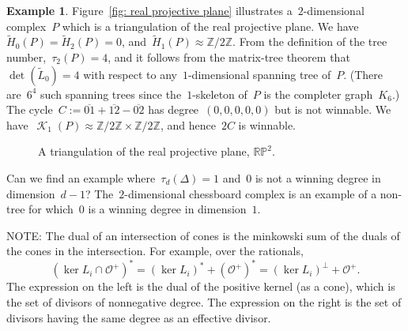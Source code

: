 \documentclass[12pt]{article}
\newcommand{\Z}{\mathbb{Z}}
\newcommand{\R}{\mathbb{R}}
\newcommand{\tL}{\widetilde{L}}
\newcommand{\tH}{\widetilde{H}}
\newcommand{\proj}{\mathbb{P}}
\DeclareMathOperator{\crit}{\mathcal{K}}
\theoremstyle{definition}
\newtheorem{example}[theorem]{Example}
\theoremstyle{remark}
\begin{document}
\begin{example}
  Figure~\ref{fig: real projective plane} illustrates a~$2$-dimensional
  complex~$P$ which is a triangulation of the real projective plane.  We
  have~$\tH_0(P)=\tH_2(P)=0$, and~$\tH_1(P)\approx\Z/2\Z$.  From the definition
  of the tree number,~$\tau_2(P)=4$, and it follows from the matrix-tree theorem
  that~$\det(\tL_0)=4$ with respect to any~$1$-dimensional spanning tree
  of~$P$.  (There are~$6^4$ such spanning trees since the~$1$-skeleton
  of~$P$ is the completer graph~$K_6$.)  The
  cycle~$C:=\overline{01}+\overline{12}-\overline{02}$ has degree~$(0,0,0,0,0)$ but
  is not winnable.  We have~$\crit_1(P)\approx\Z/2\Z\times\Z/2\Z$, and
  hence~$2C$ is winnable.
\begin{figure}[ht] 
  \centering
{}
\caption{A triangulation of the real projective plane, $\R\proj^2$.}\label{fig:
real projective plane} 
\end{figure}
\end{example}

  Can we find an example where~$\tau_d(\Delta)=1$
and~$0$ is not a winning degree in dimension~$d-1$?  The~$2$-dimensional
chessboard complex is an example of a non-tree for which~$0$ is a winning degree
in dimension~$1$.
\bigskip


NOTE: The dual of an intersection of cones is the minkowski sum of the duals of
the cones in the intersection.  For example, over the rationals,
\[
  (\ker L_i\cap\mathcal{O}^+)^* = (\ker L_i)^*+(\mathcal{O}^+)^*=(\ker
  L_i)^{\perp}+\mathcal{O}^+.
\]
The expression on the left is the dual of the positive kernel (as a cone),
which is the set of divisors of nonnegative degree.  The expression on the right
is the set of divisors having the same degree as an effective divisor.
\end{document}
